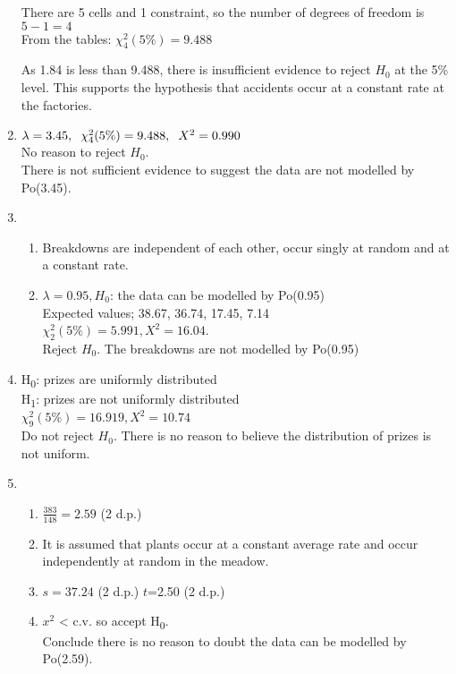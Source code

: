 \documentclass[fleqn]{article}
\begin{document}
\begin{enumerate}
        There are 5 cells and 1 constraint, so the number of degrees of freedom is $5-1=4$ \\
        From the tables: $\chi_4^2(5\%)=9.488$
        
        As 1.84 is less than 9.488, there is insufficient evidence to reject $H_0$ at the 5\% level. This supports the hypothesis that accidents occur at a constant rate at the factories.
    
    \item $\lambda=3.45, \hspace{2mm} \chi_4^2(5\%)=9.488, \hspace{2mm} X^2=0.990$ \\
        No reason to reject $H_0$. \\
        There is not sufficient evidence to suggest the data are not modelled by Po(3.45).
        
    \item \begin{enumerate}[label=\bfseries \alph*\space ]
            \item Breakdowns are independent of each other, occur singly at random and at a constant rate.
            \item $\lambda=0.95, H_0$: the data can be modelled by Po(0.95)\\
                Expected values; 38.67, 36.74, 17.45, 7.14 \\
                $\chi_2^2(5\%)=5.991, X^2=16.04$.\\
                Reject $H_0$. The breakdowns are not modelled by Po(0.95)
        \end{enumerate}
    \item H\textsubscript{0}: prizes are uniformly distributed \\
        H\textsubscript{1}: prizes are not uniformly distributed \\
        $\chi_9^2(5\%)=16.919, X^2=10.74$ \\
        Do not reject $H_0$. There is no reason to believe the distribution of prizes is not uniform.
        
    \item \begin{enumerate}[label=\bfseries \alph*\space ]
            \item $\tfrac{383}{148}=2.59$ (2 d.p.)
            \item It is assumed that plants occur at a constant average rate and occur independently at random in the meadow.
            \item $s=37.24$ (2 d.p.) \hspace{4mm} $t$=2.50 (2 d.p.)
            \item $x^2$ < c.v. so accept H\textsubscript{0}.\\
                Conclude there is no reason to doubt the data can be modelled by Po(2.59).
        \end{enumerate}
    

\end{enumerate}
\end{document}
